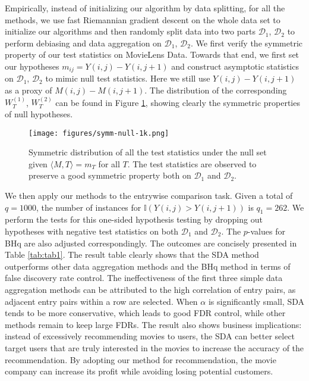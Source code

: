 \documentclass[12pt]{article}
\newcommand{\cD}{\mathcal{D}}
\theoremstyle{plain}
\begin{document}
\begin{sloppypar}
 Empirically, instead of initializing our algorithm by data splitting, for all the methods, we use fast Riemannian gradient descent \citep{wei2016guarantees,cai2022generalized} on the whole data set to initialize our algorithms and then randomly split data into two parts $\cD_1$, $\cD_2$ to perform debiasing and data aggregation on $\cD_1$, $\cD_2$.
We first verify the symmetric property of our test statistics on MovieLens Data. Towards that end, we first set our hypotheses $m_{ij}= Y(i,j)- Y(i,j+1)$ and construct asymptotic statistics on $\cD_1$, $\cD_2$ to mimic null test statistics. Here we still use $Y(i,j)- Y(i,j+1)$ as a proxy of $M(i,j)- M(i,j+1)$. The distribution of the corresponding $W_T^{(1)}$, $W_T^{(2)}$ can be found in Figure \ref{fig:symm-null-movielens}, showing clearly the symmetric properties of null hypotheses.

\begin{figure}
\centering
\texttt{[image: figures/symm-null-1k.png]}
 \caption{Symmetric distribution of all the test statistics under the null set given $\langle M, T\rangle=m_T$ for all $T$. The test statistics are observed to preserve a good symmetric property both on $\cD_1$ and $\cD_2$.}
 \label{fig:symm-null-movielens}
\end{figure}
We then apply our methods to the entrywise comparison task. Given a total of $q=1000$, the number of instances for $\mathbb{I}\left(Y\left(i, j\right)>Y\left(i, j+1\right)\right)$ is $q_1=262$. We perform the tests for this one-sided hypothesis testing by dropping out hypotheses with negative test statistics on both $\cD_1$ and $\cD_2$. The $p$-values for BHq are also adjusted correspondingly. The outcomes are concisely presented in Table \ref{tab:tab1}. The result table clearly shows that the SDA method outperforms other data aggregation methods and the BHq method in terms of false discovery rate control. The ineffectiveness of the first three simple data aggregation methods can be attributed to the high correlation of entry pairs, as adjacent entry pairs within a row are selected. When $\alpha$ is significantly small, SDA tends to be more conservative, which leads to good FDR control, while other methods remain to keep large FDRs. The result also shows business implications: instead of excessively recommending movies to users, the SDA can better select target users that are truly interested in the movies to increase the accuracy of the recommendation. By adopting our method for recommendation, the movie company can increase its profit while avoiding losing potential customers.



\end{sloppypar}
\end{document}
